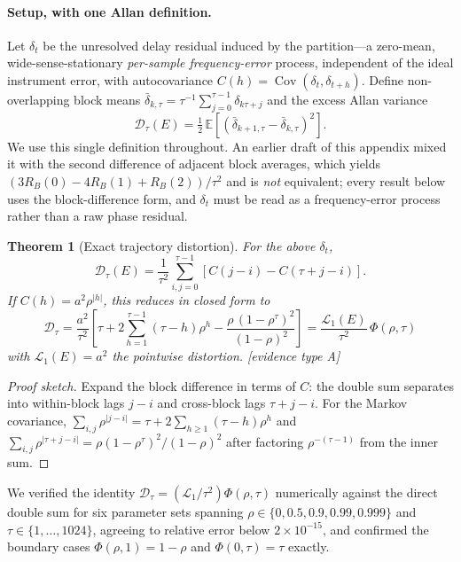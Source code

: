 \documentclass[11pt]{article}
\newtheorem{theorem}{Theorem}
\begin{document}
\paragraph{Setup, with one Allan definition.} Let $\delta_t$ be the unresolved
delay residual induced by the partition---a zero-mean, wide-sense-stationary
\emph{per-sample frequency-error} process, independent of the ideal instrument error, with
autocovariance $C(h)=\operatorname{Cov}(\delta_t,\delta_{t+h})$. Define
non-overlapping block means $\bar\delta_{k,\tau}=\tau^{-1}\sum_{j=0}^{\tau-1}
\delta_{k\tau+j}$ and the excess Allan variance
\begin{equation}
\mathcal{D}_\tau(E) = \tfrac12\,\mathbb{E}\left[(\bar\delta_{k+1,\tau}-
\bar\delta_{k,\tau})^{2}\right].
\end{equation}
We use this single definition throughout. An earlier draft of this appendix mixed it with
the second difference of adjacent block averages, which yields
$(3R_B(0)-4R_B(1)+R_B(2))/\tau^{2}$ and is \emph{not} equivalent; every result below uses
the block-difference form, and $\delta_t$ must be read as a frequency-error process rather
than a raw phase residual.

\begin{theorem}[Exact trajectory distortion]\label{thm:traj}
For the above $\delta_t$,
\begin{equation}
\mathcal{D}_\tau(E)=\frac{1}{\tau^{2}}\sum_{i,j=0}^{\tau-1}
\left[C(j-i)-C(\tau+j-i)\right].
\end{equation}
If $C(h)=a^{2}\rho^{\lvert h\rvert}$, this reduces in closed form to
\begin{equation}
\boxed{\;\mathcal{D}_\tau=\frac{a^{2}}{\tau^{2}}
\left[\tau+2\sum_{h=1}^{\tau-1}(\tau-h)\rho^{h}
-\frac{\rho\,(1-\rho^{\tau})^{2}}{(1-\rho)^{2}}\right]
=\frac{\mathcal{L}_1(E)}{\tau^{2}}\,\Phi(\rho,\tau)\;}
\end{equation}
with $\mathcal{L}_1(E)=a^{2}$ the pointwise distortion. [evidence type A]
\end{theorem}
\begin{proof}[Proof sketch]
Expand the block difference in terms of $C$: the double sum separates into within-block
lags $j-i$ and cross-block lags $\tau+j-i$. For the Markov covariance,
$\sum_{i,j}\rho^{\lvert j-i\rvert}=\tau+2\sum_{h\ge1}(\tau-h)\rho^{h}$ and
$\sum_{i,j}\rho^{\lvert\tau+j-i\rvert}=\rho(1-\rho^{\tau})^{2}/(1-\rho)^{2}$ after
factoring $\rho^{-(\tau-1)}$ from the inner sum.
\end{proof}

We verified the identity $\mathcal{D}_\tau=(\mathcal{L}_1/\tau^{2})\Phi(\rho,\tau)$
numerically against the direct double sum for six parameter sets spanning
$\rho\in\{0,0.5,0.9,0.99,0.999\}$ and $\tau\in\{1,\dots,1024\}$, agreeing to relative error
below $2\times10^{-15}$, and confirmed the boundary cases $\Phi(\rho,1)=1-\rho$ and
$\Phi(0,\tau)=\tau$ exactly.
\end{document}
